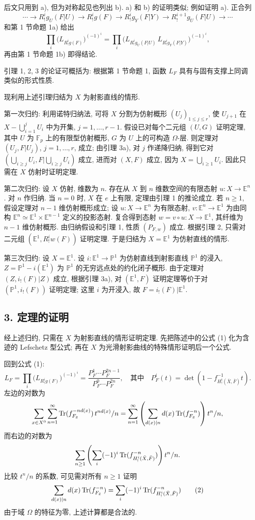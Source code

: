 后文只用到 a), 但为对称起见也列出 b). a) 和 b) 的证明类似; 例如证明 a). 正合列
\[
\cdots\longrightarrow R^i_!g_U(F|U)\longrightarrow R^i_!g(F)
\longrightarrow R^i_!g_Y(F|Y)\longrightarrow R^{i+1}_!g_U(F|U)\longrightarrow\cdots
\]
和第 1 节命题 1a) 给出
\[
\prod_i\bigl(L_{R^i_!g(F)}\bigr)^{(-1)^i}
=\prod_i\bigl(L_{R^i_!g_U(F|U)}\,L_{R^i_!g_Y(F|Y)}\bigr)^{(-1)^i},
\]
再由第 1 节命题 1b) 即得结论.

引理 1, 2, 3 的论证可概括为: 根据第 1 节命题 1, 函数 $L_F$ 具有与固有支撑上同调类似的形式性质.

现利用上述引理归结为 $X$ 为射影直线的情形.

第一次归约: 利用诺特归纳法, 可将 $X$ 分割为仿射概形 $(U_j)_{1\le j\le r}$, 使 $U_{j+1}$ 在 $X-\bigcup_{i=1}^jU_i$ 中为开集, $j=1,\ldots,r-1$. 假设已对每个二元组 $(U,G)$ 证明定理, 其中 $U$ 为 $\mathbb F_p$ 上的有限型仿射概形, $G$ 为 $U$ 上的可构造 $\Omega$-层. 则定理对 $(U_j,F|U_j)$, $j=1,\ldots,r$, 成立; 由引理 3a), 对 $j$ 作递降归纳, 得到它对 $(\bigcup_{i\ge j}U_i,F|\bigcup_{i\ge j}U_i)$ 成立, 进而对 $(X,F)$ 成立, 因为 $X=\bigcup_{i\ge1}U_i$. 因此只需在 $X$ 仿射时证明定理.

第二次归约: 设 $X$ 仿射, 维数为 $n$. 存在从 $X$ 到 $n$ 维数空间的有限态射 $u:X\to\mathbb E^n$. 对 $n$ 作归纳. 当 $n=0$ 时, $X$ 在 $e$ 上有限, 定理由引理 1 的推论成立. 若 $n\ge1$, 假设定理对 $n-1$ 维仿射概形成立; 设 $u:X\to\mathbb E^n$ 为有限态射, $v:\mathbb E^n\to\mathbb E^1$ 为由同构 $\mathbb E^n\simeq\mathbb E^1\times\mathbb E^{n-1}$ 定义的投影态射. 复合得到态射 $w=v\circ u:X\to\mathbb E^1$, 其纤维为 $n-1$ 维仿射概形. 由归纳假设和引理 1, 性质 $(P_{F,w})$ 成立. 根据引理 2, 只需对二元组 $(\mathbb E^1,R^i_!w(F))$ 证明定理. 于是归结为 $X=\mathbb E^1$ 为仿射直线的情形.

第三次归约: 设 $X=\mathbb E^1$. 设 $i:\mathbb E^1\to\mathbb P^1$ 为仿射直线到射影直线 $\mathbb P^1$ 的浸入, $Z=\mathbb P^1-i(\mathbb E^1)$ 为 $\mathbb P^1$ 的无穷远点处的约化闭子概形. 由于定理对 $(Z,i_!(F)|Z)$ 成立, 根据引理 3a), 对 $(\mathbb E^1,F)$ 证明定理等价于对 $(\mathbb P^1,i_!(F))$ 证明定理; 这里 $i$ 为开浸入, 故 $F=i_!(F)|\mathbb E^1$.

\subsection*{3. 定理的证明}

经上述归约, 只需在 $X$ 为射影直线的情形证明定理. 先把陈述中的公式 (1) 化为含迹的 Lefschetz 型公式; 再在 $X$ 为光滑射影曲线的特殊情形证明后一个公式.

回到公式 (1):
\[
L_F=\prod_i\bigl(L_{R^i_!g(F)}\bigr)^{(-1)^i}
=\frac{P_F^1\cdots P_F^{2n-1}}{P_F^0\cdots P_F^{2n}},
\quad\text{其中}\quad
P_F^i(t)=\det(1-f^{-1}_{H^i_!(\bar X,\bar F)}t).
\]
左边的对数为
\[
\sum_{x\in X^0}\sum_{n=1}^{\infty}\operatorname{Tr}(f_{F_{\bar x}}^{-n d(x)})\,t^{n d(x)}/n
=\sum_{n=1}^{\infty}\left(\sum_{d(x)|n} d(x)\operatorname{Tr}(f_{F_{\bar x}}^{-n})\right)t^n/n,
\]
而右边的对数为
\[
\sum_{n\ge1}\left(\sum_i(-1)^i\operatorname{Tr}(f^{-n}_{H^i_!(\bar X,\bar F)})\right)t^n/n.
\]
比较 $t^n/n$ 的系数, 可见需对所有 $n\ge1$ 证明
\[
\sum_{d(x)|n}d(x)\operatorname{Tr}(f_{F_{\bar x}}^{-n})
=\sum_i(-1)^i\operatorname{Tr}(f^{-n}_{H^i_!(\bar X,\bar F)})
\tag{2}
\]
由于域 $\Omega$ 的特征为零, 上述计算都是合法的.

